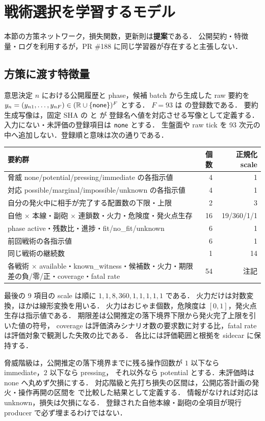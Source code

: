 \section{戦術選択を学習するモデル}\label{sec:learning}
本節の方策ネットワーク，損失関数，更新則は\textbf{提案}である．
公開契約・特徴量・ログを利用するが，PR \#188 に同じ学習器が存在すると主張しない．

\subsection{方策に渡す特徴量}
意思決定 $n$ における公開履歴と phase，候補 batch から生成した raw 要約を
$y_n=(y_{n1},\ldots,y_{nF})\in(\mathbb{R}\cup\{\mathsf{none}\})^F$ とする．
$F=93$ は  の登録数である．
要約生成写像は，固定 SHA の  と  が
登録名へ値を対応させる写像として定義する．入力にない・未評価の登録項目は $\mathsf{none}$ とする．
生盤面や raw tick を 93 次元の中へ追加しない．登録順と意味は次の通りである．
\begin{center}\begin{tabular}{p{.59\linewidth}rr}\toprule 要約群 & 個数 & 正規化 scale\\\midrule
脅威 none/potential/pressing/immediate の各指示値 &4&1\\
対応 possible/marginal/impossible/unknown の各指示値 &4&1\\
自分の発火中に相手が完了する配置数の下限・上限 &2&3\\
自他 $\times$ 本線・副砲 $\times$ 連鎖数・火力・危険度・発火点生存 &16&19/360/1/1\\
phase active・残数比・進捗・fit/no\_fit/unknown &6&1\\
前回戦術の各指示値 &6&1\\
同じ戦術の継続数 &1&14\\
各戦術 $\times$ available・known\_witness・候補数・火力・期限差の負/零/正・coverage・fatal rate &54&注記\\\bottomrule\end{tabular}\end{center}
最後の 9 項目の scale は順に $1,1,8,360,1,1,1,1,1$ である．
火力だけは対数変換，ほかは線形変換を用いる．
火力はおじゃま個数，危険度は $[0,1]$，発火点生存は指示値である．
期限差は公開推定の落下境界下限から発火完了上限を引いた値の符号，
coverage は評価済みシナリオ数の要求数に対する比，fatal rate は評価対象で観測した失敗の比である．
各比には評価範囲と根拠を sidecar に保持する．

脅威階級は，公開推定の落下境界までに残る操作回数が $1$ 以下なら immediate，$2$ 以下なら pressing，
それ以外なら potential とする．未評価時は none へ丸めず欠損にする．
対応階級と先打ち損失の区間は，公開応答計画の発火・操作再開の区間を
 で比較した結果として定義する．
情報がなければ対応は unknown，損失は欠損になる．
登録された自他本線・副砲の全項目が現行 producer で必ず埋まるわけではない．

